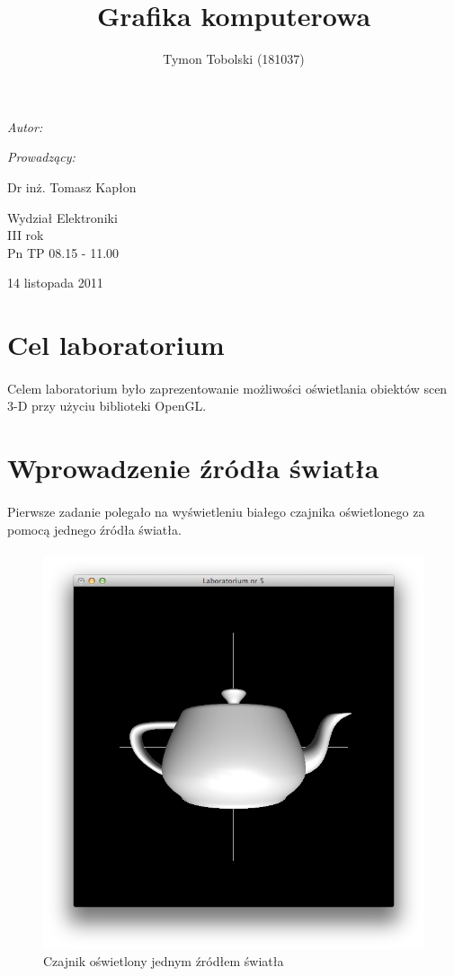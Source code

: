 \documentclass[wide,a4paper,titlepage,12pt] {article}
\title{Grafika komputerowa}
\author{Tymon Tobolski (181037)}
\makeatletter
\renewcommand{\maketitle}{
\begin{titlepage}
  \begin{center}
    \vspace*{3cm}
    \LARGE \@title \par
    \vspace{2cm}
    \textit{\small Autor:}\par
    \normalsize \@author\par \normalsize
    \vspace{3cm}
    \textit{\small Prowadzący:}\par
    Dr inż. Tomasz Kapłon \par
    \vspace{2cm}
    Wydział Elektroniki\\ III rok\\ Pn TP 08.15 - 11.00\par
    \vspace{4cm}
    \small 14 listopada 2011
  \end{center}
\end{titlepage}
}
\makeatother
\begin{document}
\maketitle
  \section{Cel laboratorium}
  \paragraph{}
  Celem laboratorium było zaprezentowanie możliwości oświetlania obiektów scen 3-D przy użyciu biblioteki OpenGL.

  \section{Wprowadzenie źródła światła}
  \paragraph{}
  Pierwsze zadanie polegało na wyświetleniu białego czajnika oświetlonego za pomocą jednego źródła światła.
  \paragraph{}
  

  \begin{figure}[h!]
    \begin{center}
      \includegraphics[width=\textwidth]{1.png}
      \caption{Czajnik oświetlony jednym źródłem światła}
    \end{center}
  \end{figure}
\end{document}
